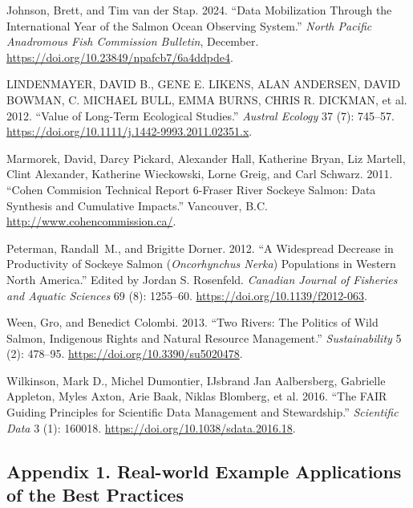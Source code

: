 \documentclass[
  letterpaper,
  DIV=11,
  numbers=noendperiod]{scrartcl}
\newlength{\cslhangindent}
\newenvironment{CSLReferences}[2] %
 {\begin{list}{}{%
  \setlength{\itemindent}{0pt}
  \setlength{\leftmargin}{0pt}
  \setlength{\parsep}{0pt}
  \ifodd #1
   \setlength{\leftmargin}{\cslhangindent}
   \setlength{\itemindent}{-1\cslhangindent}
  \fi
  \setlength{\itemsep}{#2\baselineskip}}}
 {\end{list}}
\begin{document}
\begin{CSLReferences}{1}{0}
Johnson, Brett, and Tim van der Stap. 2024. {``Data Mobilization Through
the International Year of the Salmon Ocean Observing System.''}
\emph{North Pacific Anadromous Fish Commission Bulletin}, December.
\url{https://doi.org/10.23849/npafcb7/6a4ddpde4}.

LINDENMAYER, DAVID B., GENE E. LIKENS, ALAN ANDERSEN, DAVID BOWMAN, C.
MICHAEL BULL, EMMA BURNS, CHRIS R. DICKMAN, et al. 2012. {``Value of
Long{-}Term Ecological Studies.''} \emph{Austral Ecology} 37 (7):
745--57. \url{https://doi.org/10.1111/j.1442-9993.2011.02351.x}.

Marmorek, David, Darcy Pickard, Alexander Hall, Katherine Bryan, Liz
Martell, Clint Alexander, Katherine Wieckowski, Lorne Greig, and Carl
Schwarz. 2011. {``Cohen Commision Technical Report 6-Fraser River
Sockeye Salmon: Data Synthesis and Cumulative Impacts.''} Vancouver,
B.C. \url{http://www.cohencommission.ca/}.

Peterman, Randall~M., and Brigitte Dorner. 2012. {``A Widespread
Decrease in Productivity of Sockeye Salmon ({\emph{Oncorhynchus Nerka}})
Populations in Western North America.''} Edited by Jordan S. Rosenfeld.
\emph{Canadian Journal of Fisheries and Aquatic Sciences} 69 (8):
1255--60. \url{https://doi.org/10.1139/f2012-063}.

Ween, Gro, and Benedict Colombi. 2013. {``Two Rivers: The Politics of
Wild Salmon, Indigenous Rights and Natural Resource Management.''}
\emph{Sustainability} 5 (2): 478--95.
\url{https://doi.org/10.3390/su5020478}.

Wilkinson, Mark D., Michel Dumontier, IJsbrand Jan Aalbersberg,
Gabrielle Appleton, Myles Axton, Arie Baak, Niklas Blomberg, et al.
2016. {``The FAIR Guiding Principles for Scientific Data Management and
Stewardship.''} \emph{Scientific Data} 3 (1): 160018.
\url{https://doi.org/10.1038/sdata.2016.18}.

\end{CSLReferences}

\subsection{Appendix 1. Real-world Example Applications of the Best
Practices}\label{appendix-1.-real-world-example-applications-of-the-best-practices}
\end{document}
